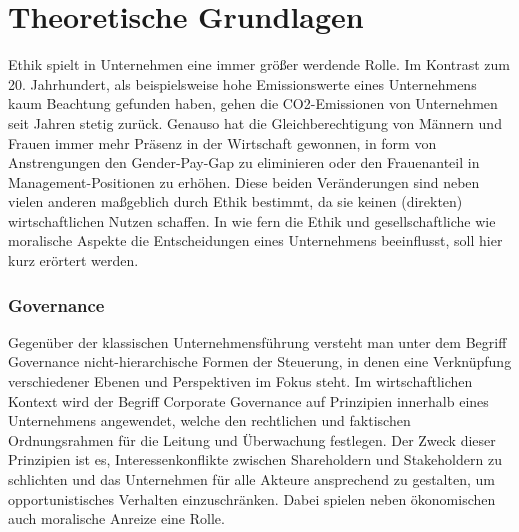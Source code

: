 \documentclass[12pt]{article}
\begin{document}
\renewcommand{\mytitle}{Governanceethik und\\moralische Anreize}%
\renewcommand{\myauthor}{Lennart Schulte-Kellinghaus,\\Timo Stovermann}%
\renewcommand{\headheight}{27pt}%



\frontmatter%


\printabbreviations%
\clearpage
\renewcommand{\plaintitle}{Inhaltsverzeichnis}%
{\def\makebox[#1][#2]#3{#3}%
	\tableofcontents
}


\clearpage
\mainmatter%

\part{Theoretische Grundlagen}
Ethik spielt in Unternehmen eine immer größer werdende Rolle. Im Kontrast zum 20. Jahrhundert, als beispielsweise hohe Emissionswerte eines Unternehmens kaum Beachtung gefunden haben, gehen die CO2-Emissionen von Unternehmen seit Jahren stetig zurück. Genauso hat die Gleichberechtigung von Männern und Frauen immer mehr Präsenz in der Wirtschaft gewonnen, in form von Anstrengungen den Gender-Pay-Gap zu eliminieren oder den Frauenanteil in Management-Positionen zu erhöhen. Diese beiden Veränderungen sind neben vielen anderen maßgeblich durch Ethik bestimmt, da sie keinen (direkten) wirtschaftlichen Nutzen schaffen. In wie fern die Ethik und gesellschaftliche wie moralische Aspekte die Entscheidungen eines Unternehmens beeinflusst, soll hier kurz erörtert werden.
\section{Governance}
Gegenüber der klassischen Unternehmensführung versteht man unter dem Begriff Governance nicht-hierarchische Formen der Steuerung, in denen eine Verknüpfung verschiedener Ebenen und Perspektiven im Fokus steht. Im wirtschaftlichen Kontext wird der Begriff Corporate Governance auf Prinzipien innerhalb eines Unternehmens angewendet, welche den rechtlichen und faktischen Ordnungsrahmen für die Leitung und Überwachung festlegen. Der Zweck dieser Prinzipien ist es, Interessenkonflikte zwischen Shareholdern und Stakeholdern zu schlichten und das Unternehmen für alle Akteure ansprechend zu gestalten, um opportunistisches Verhalten einzuschränken. Dabei spielen neben ökonomischen auch moralische Anreize eine Rolle.
\end{document}
